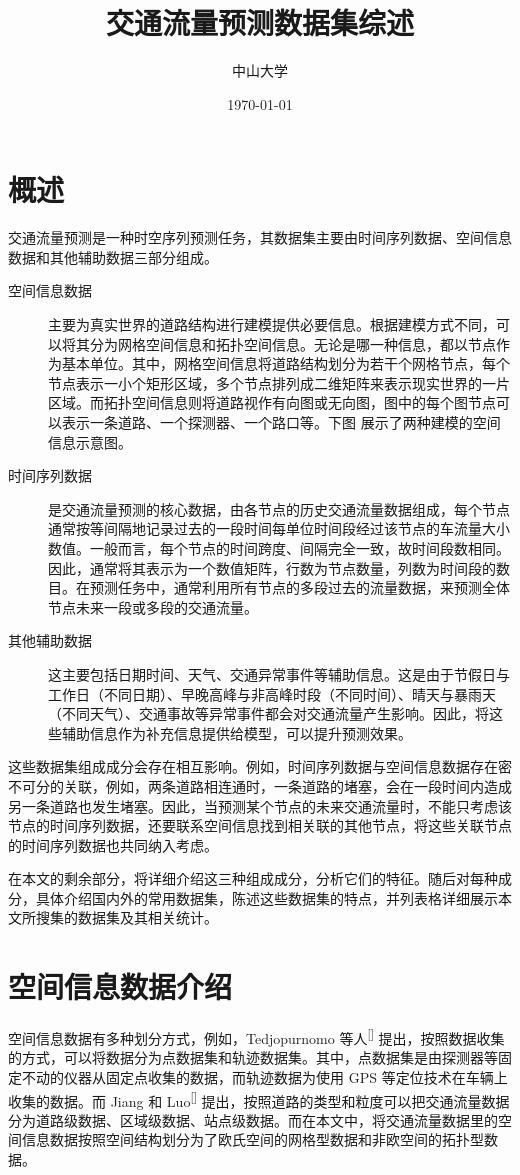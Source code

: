 \documentclass{ctexart}
\renewcommand{\cite}[1]{\textsuperscript{[\citenum{#1}]}}
\begin{document}
\title{交通流量预测数据集综述}
\author{中山大学}
\date{\today}
\maketitle
\tableofcontents
\section{概述}

交通流量预测是一种时空序列预测任务，其数据集主要由时间序列数据、空间信息数据和其他辅助数据三部分组成。

\begin{description}
    \item[空间信息数据] 主要为真实世界的道路结构进行建模提供必要信息。根据建模方式不同，可以将其分为网格空间信息和拓扑空间信息。无论是哪一种信息，都以节点作为基本单位。其中，网格空间信息将道路结构划分为若干个网格节点，每个节点表示一小个矩形区域，多个节点排列成二维矩阵来表示现实世界的一片区域。而拓扑空间信息则将道路视作有向图或无向图，图中的每个图节点可以表示一条道路、一个探测器、一个路口等。下图 展示了两种建模的空间信息示意图。%
    \item[时间序列数据] 是交通流量预测的核心数据，由各节点的历史交通流量数据组成，每个节点通常按等间隔地记录过去的一段时间每单位时间段经过该节点的车流量大小数值。一般而言，每个节点的时间跨度、间隔完全一致，故时间段数相同。因此，通常将其表示为一个数值矩阵，行数为节点数量，列数为时间段的数目。在预测任务中，通常利用所有节点的多段过去的流量数据，来预测全体节点未来一段或多段的交通流量。
    \item[其他辅助数据] 这主要包括日期时间、天气、交通异常事件等辅助信息。这是由于节假日与工作日（不同日期）、早晚高峰与非高峰时段（不同时间）、晴天与暴雨天（不同天气）、交通事故等异常事件都会对交通流量产生影响。因此，将这些辅助信息作为补充信息提供给模型，可以提升预测效果。
\end{description}

这些数据集组成成分会存在相互影响。例如，时间序列数据与空间信息数据存在密不可分的关联，例如，两条道路相连通时，一条道路的堵塞，会在一段时间内造成另一条道路也发生堵塞。因此，当预测某个节点的未来交通流量时，不能只考虑该节点的时间序列数据，还要联系空间信息找到相关联的其他节点，将这些关联节点的时间序列数据也共同纳入考虑。

在本文的剩余部分，将详细介绍这三种组成成分，分析它们的特征。随后对每种成分，具体介绍国内外的常用数据集，陈述这些数据集的特点，并列表格详细展示本文所搜集的数据集及其相关统计。

\section{空间信息数据介绍}
空间信息数据有多种划分方式，例如，Tedjopurnomo 等人\cite{T-ZS1} 提出，按照数据收集的方式，可以将数据分为点数据集和轨迹数据集。其中，点数据集是由探测器等固定不动的仪器从固定点收集的数据，而轨迹数据为使用 GPS 等定位技术在车辆上收集的数据。而 Jiang 和 Luo\cite{T-ZS2} 提出，按照道路的类型和粒度可以把交通流量数据分为道路级数据、区域级数据、站点级数据。而在本文中，将交通流量数据里的空间信息数据按照空间结构划分为了欧氏空间的网格型数据和非欧空间的拓扑型数据。
\end{document}
